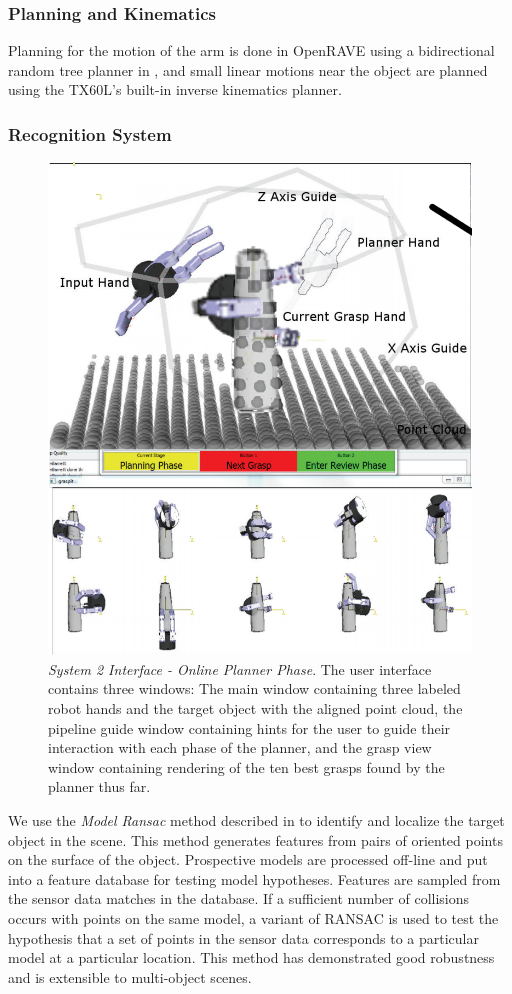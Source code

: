 \subsubsection{Planning and Kinematics}
Planning for the motion of the arm is done in OpenRAVE using a bidirectional random tree planner in \cite{berenson-cbirrt}, and small linear motions near the object are planned using the TX60L's built-in inverse kinematics planner.

\subsubsection{Recognition System}
\label{sec:rec_system}
\begin{figure}
	\centering
	\includegraphics[width=.9\columnwidth]{ui_2_flipped.png}
	\caption{\emph{System 2 Interface - Online Planner Phase}. The user interface contains three windows: The main window containing three labeled robot hands and the target object with the aligned point cloud, the pipeline guide window containing hints for the user to guide their interaction with each phase of the planner, and the grasp view window containing rendering of the ten best grasps found by the planner thus far.}
	\label{fig:ui_2}
\end{figure}
 We use the \emph{Model Ransac} method described in \cite{EfficientModelRansac} to identify and localize the target object in the scene. This method generates features from pairs of oriented points on the surface of the object. Prospective models are processed off-line and put into a feature database for testing model hypotheses.  Features are sampled from the sensor data matches in the database. If a sufficient number of collisions occurs with points on the same model, a variant of RANSAC is used to test the hypothesis that a set of points in the sensor data corresponds to a particular model at a particular location. This method has demonstrated good robustness and is extensible to multi-object scenes. 

